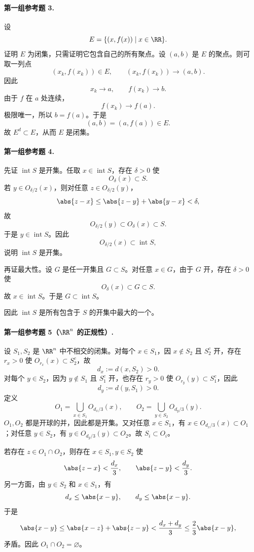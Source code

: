 \paragraph{第一组参考题 3.}
\begin{xsolution}
设
\[
  E=\{(x,f(x))\mid x\in\RR\}.
\]
证明 $E$ 为闭集，只需证明它包含自己的所有聚点。设 $(a,b)$ 是 $E$ 的聚点。则可取一列点
\[
  (x_k,f(x_k))\in E,
  \qquad
  (x_k,f(x_k))\to(a,b).
\]
因此
\[
  x_k\to a,
  \qquad
  f(x_k)\to b.
\]
由于 $f$ 在 $a$ 处连续，
\[
  f(x_k)\to f(a).
\]
极限唯一，所以 $b=f(a)$。于是
\[
  (a,b)=(a,f(a))\in E.
\]
故 $E^d\subset E$，从而 $E$ 是闭集。
\end{xsolution}

\paragraph{第一组参考题 4.}
\begin{xsolution}
先证 $\operatorname{int}S$ 是开集。任取 $x\in\operatorname{int}S$，存在 $\delta>0$ 使
\[
  O_\delta(x)\subset S.
\]
若 $y\in O_{\delta/2}(x)$，则对任意 $z\in O_{\delta/2}(y)$，
\[
  \abs{z-x}\leq\abs{z-y}+\abs{y-x}<\delta,
\]
故
\[
  O_{\delta/2}(y)\subset O_\delta(x)\subset S.
\]
于是 $y\in\operatorname{int}S$。因此
\[
  O_{\delta/2}(x)\subset\operatorname{int}S,
\]
说明 $\operatorname{int}S$ 是开集。

再证最大性。设 $G$ 是任一开集且 $G\subset S$。对任意 $x\in G$，由于 $G$ 开，存在 $\delta>0$ 使
\[
  O_\delta(x)\subset G\subset S.
\]
故 $x\in\operatorname{int}S$。于是 $G\subset\operatorname{int}S$。

因此 $\operatorname{int}S$ 是所有包含于 $S$ 的开集中最大的一个。
\end{xsolution}

\paragraph{第一组参考题 5（$\RR^n$ 的正规性）.}
\begin{xsolution}
设 $S_1,S_2$ 是 $\RR^n$ 中不相交的闭集。对每个 $x\in S_1$，因 $x\notin S_2$ 且 $S_2^c$ 开，存在 $r_x>0$ 使 $O_{r_x}(x)\subset S_2^c$，故
\[
  d_x:=d(x,S_2)>0.
\]
对每个 $y\in S_2$，因为 $y\notin S_1$ 且 $S_1^c$ 开，也存在 $r_y>0$ 使 $O_{r_y}(y)\subset S_1^c$，因此
\[
  d_y:=d(y,S_1)>0.
\]
定义
\[
  O_1=\bigcup_{x\in S_1}O_{d_x/3}(x),
  \qquad
  O_2=\bigcup_{y\in S_2}O_{d_y/3}(y).
\]
$O_1,O_2$ 都是开球的并，因此都是开集。又对任意 $x\in S_1$，有 $x\in O_{d_x/3}(x)\subset O_1$；对任意 $y\in S_2$，有 $y\in O_{d_y/3}(y)\subset O_2$。故 $S_i\subset O_i$。

若存在 $z\in O_1\cap O_2$，则存在 $x\in S_1,y\in S_2$ 使
\[
  \abs{z-x}<\frac{d_x}{3},
  \qquad
  \abs{z-y}<\frac{d_y}{3}.
\]
另一方面，由 $y\in S_2$ 和 $x\in S_1$，有
\[
  d_x\leq\abs{x-y},
  \qquad
  d_y\leq\abs{x-y}.
\]
于是
\[
  \abs{x-y}
  \leq\abs{x-z}+\abs{z-y}
  <\frac{d_x+d_y}{3}
  \leq\frac{2}{3}\abs{x-y},
\]
矛盾。因此 $O_1\cap O_2=\varnothing$。
\end{xsolution}

